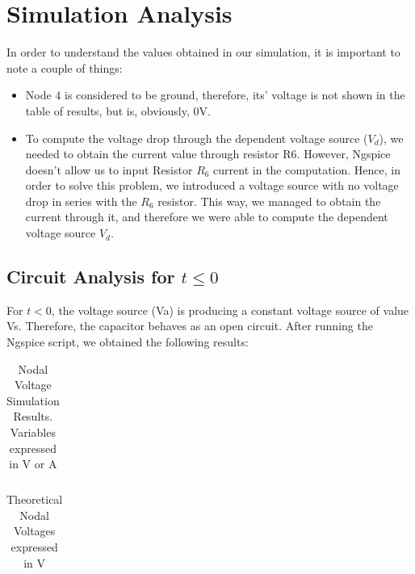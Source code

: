 \section{Simulation Analysis}
\label{simuanal}

In order to understand the values obtained in our simulation, it is important to note a couple of things:
\begin{itemize}
    \item Node 4 is considered to be ground, therefore, its' voltage is not shown in the table of results, but is, obviously, 0V.
    \item To compute the voltage drop through the dependent voltage source ($V_d$), we needed to obtain
the current value through resistor R6. However, Ngspice doesn’t allow us to input Resistor $R_6$ current in the computation. Hence, in order to solve this problem, we introduced a voltage source
with no voltage drop in series with the $R_6$ resistor. This way, we managed to obtain the current
through it, and therefore we were able to compute the dependent voltage source $V_d$.
\end{itemize}

\subsection{Circuit Analysis for $t \leq 0 $}

For $t < 0$, the voltage source (Va) is producing a constant voltage source of value Vs. Therefore, the capacitor behaves as an open circuit. After running the Ngspice script, we obtained the following results:

\begin{table}[h]
\centering
\begin{tabularx}{0.6\textwidth} {
  | >{\raggedright\arraybackslash}X
  | >{\raggedleft\arraybackslash}X | }
 \hline

\end{tabularx}
\caption{Nodal Voltage Simulation Results. Variables expressed in V or A}
\end{table}

\begin{table}[h]
\centering
\begin{tabularx}{0.6\textwidth} {
  | >{\raggedright\arraybackslash}X
  | >{\raggedleft\arraybackslash}X | }
 \hline

\end{tabularx}
\caption{Theoretical Nodal Voltages expressed in V}
\end{table}

